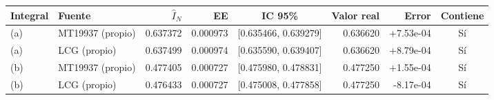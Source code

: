 \begin{tabular}{llrrcrrc}
\toprule
Integral & Fuente & $\hat I_N$ & EE & IC 95\% & Valor real & Error & Contiene \\
\midrule
(a) & MT19937 (propio) & 0.637372 & 0.000973 & [0.635466, 0.639279] & 0.636620 & +7.53e-04 & Sí \\
(a) & LCG (propio) & 0.637499 & 0.000974 & [0.635590, 0.639407] & 0.636620 & +8.79e-04 & Sí \\
(b) & MT19937 (propio) & 0.477405 & 0.000727 & [0.475980, 0.478831] & 0.477250 & +1.55e-04 & Sí \\
(b) & LCG (propio) & 0.476433 & 0.000727 & [0.475008, 0.477858] & 0.477250 & -8.17e-04 & Sí \\
\bottomrule
\end{tabular}
